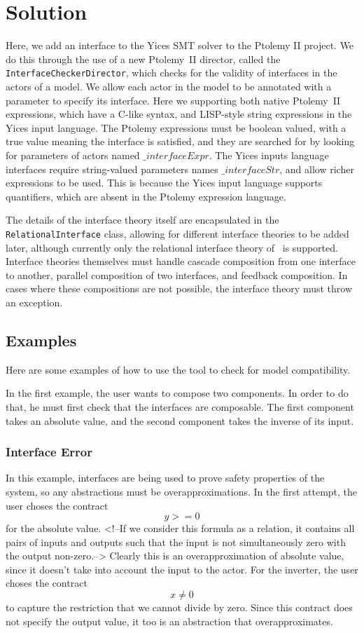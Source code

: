 \documentclass[preprint,11pt,authoryear]{sigplanconf}
\begin{document}
\section{Solution}
Here, we add an interface to the Yices\cite{yices} SMT solver to the Ptolemy II\cite{ptII} project.
We do this through the use of a new Ptolemy~II director, called the \texttt{InterfaceCheckerDirector}, which checks for the validity of interfaces in the actors of a model.
We allow each actor in the model to be annotated with a parameter to specify its interface.
Here we supporting both native Ptolemy~II expressions, which have a C-like syntax, and LISP-style string expressions in the Yices input language.
The Ptolemy expressions must be boolean valued, with a true value meaning the interface is satisfied, and they are searched for by looking for parameters of actors named $\_interfaceExpr$.
The Yices inputs language interfaces require string-valued parameters names $\_interfaceStr$, and allow richer expressions to be used.
This is because the Yices input language supports quantifiers, which are absent in the Ptolemy expression language.

The details of the interface theory itself are encapsulated in the \texttt{RelationalInterface} class, allowing for different interface theories to be added later, although currently only the relational interface theory of~\cite{relationalInterfaces} is supported.
Interface theories themselves must handle cascade composition from one interface to another, parallel composition of two interfaces,
and feedback composition.  In cases where these compositions are not possible, the interface theory must throw an exception.

\subsection{Examples}
Here are some examples of how to use the tool to check for model compatibility.

In the first example, the user wants to compose two components.  In order to do that, he must first check that the interfaces are composable.  The first component takes an absolute value, and the second component takes the inverse of its input.

\subsubsection{Interface Error}
In this example, interfaces are being used to prove safety properties of the system, so any abstractions must be overapproximations.  In the first attempt, the user choses the contract
\[
y >= 0
\]
for the absolute value.  <!--If we consider this formula as a relation, it contains all pairs of inputs and outputs such that the input is not simultaneously zero with the output non-zero.-->  Clearly this is an overapproximation of absolute value, since it doesn't take into account the input to the actor.
For the inverter, the user choses the contract
\[
x \ne 0
\]
to capture the restriction that we cannot divide by zero.  Since this contract does not specify the output value, it too is an abstraction that overapproximates.
\end{document}
